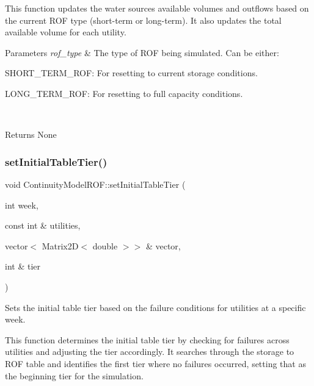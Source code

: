 This function updates the water sources\textquotesingle{} available volumes and outflows based on the current R\+OF type (short-\/term or long-\/term). It also updates the total available volume for each utility.


\begin{DoxyParams}{Parameters}
{\em rof\+\_\+type} & The type of R\+OF being simulated. Can be either\+:
\begin{DoxyItemize}
\item {\ttfamily S\+H\+O\+R\+T\+\_\+\+T\+E\+R\+M\+\_\+\+R\+OF}\+: For resetting to current storage conditions.
\item {\ttfamily L\+O\+N\+G\+\_\+\+T\+E\+R\+M\+\_\+\+R\+OF}\+: For resetting to full capacity conditions.
\end{DoxyItemize}\\
\hline
\end{DoxyParams}
\begin{DoxyReturn}{Returns}
None 
\end{DoxyReturn}
\mbox{\label{classContinuityModelROF_a0c46d5905f5d0ae2cf0abd0d4653bbc7}} 
\subsubsection{\texorpdfstring{set\+Initial\+Table\+Tier()}{setInitialTableTier()}}
{\footnotesize\ttfamily void Continuity\+Model\+R\+O\+F\+::set\+Initial\+Table\+Tier (\begin{DoxyParamCaption}\item[{int}]{week,  }\item[{const int \&}]{utilities,  }\item[{vector$<$ Matrix2D$<$ double $>$$>$ \&}]{vector,  }\item[{int \&}]{tier }\end{DoxyParamCaption})}



Sets the initial table tier based on the failure conditions for utilities at a specific week. 

This function determines the initial table tier by checking for failures across utilities and adjusting the tier accordingly. It searches through the storage to R\+OF table and identifies the first tier where no failures occurred, setting that as the beginning tier for the simulation.


